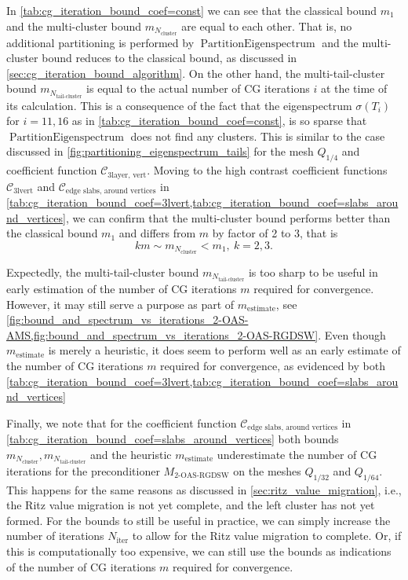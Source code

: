 In \cref{tab:cg_iteration_bound_coef=const} we can see that the classical bound $m_1$ and the multi-cluster bound $m_{N_{\text{cluster}}}$ are equal to each other. That is, no additional partitioning is performed by $\operatorname{PartitionEigenspectrum}$ and the multi-cluster bound reduces to the classical bound, as discussed in \cref{sec:cg_iteration_bound_algorithm}. 
On the other hand, the multi-tail-cluster bound $m_{N_{\text{tail-cluster}}}$ is equal to the actual number of CG iterations $i$ at the time of its calculation. This is a consequence of the fact that the eigenspectrum $\sigma(T_{i})$ for $i=11,16$ as in \cref{tab:cg_iteration_bound_coef=const}, is so sparse that $\operatorname{PartitionEigenspectrum}$ does not find any clusters. This is similar to the case discussed in \cref{fig:partitioning_eigenspectrum_tails} for the mesh $Q_{1/4}$ and coefficient function $\mathcal{C}_{\text{3layer, vert}}$.
Moving to the high contrast coefficient functions $\mathcal{C}_{\text{3lvert}}$ and $\mathcal{C}_{\text{edge slabs, around vertices}}$ in \cref{tab:cg_iteration_bound_coef=3lvert,tab:cg_iteration_bound_coef=slabs_around_vertices}, we can confirm that the multi-cluster bound performs better than the classical bound $m_1$ and differs from $m$ by factor of 2 to 3, that is  
\begin{equation}
    km \sim m_{N_{\text{cluster}}} < m_1, \ k = 2,3.
    \label{eq:multi_cluster_bound_factor}
\end{equation}

Expectedly, the multi-tail-cluster bound $m_{N_{\text{tail-cluster}}}$ is too sharp to be useful in early estimation of the number of CG iterations $m$ required for convergence. However, it may still serve a purpose as part of $m_{\text{estimate}}$, see \cref{fig:bound_and_spectrum_vs_iterations_2-OAS-AMS,fig:bound_and_spectrum_vs_iterations_2-OAS-RGDSW}. Even though $m_{\text{estimate}}$ is merely a heuristic, it does seem to perform well as an early estimate of the number of CG iterations $m$ required for convergence, as evidenced by both \cref{tab:cg_iteration_bound_coef=3lvert,tab:cg_iteration_bound_coef=slabs_around_vertices}

Finally, we note that for the coefficient function $\mathcal{C}_{\text{edge slabs, around vertices}}$ in \cref{tab:cg_iteration_bound_coef=slabs_around_vertices} both bounds $m_{N_{\text{cluster}}}, m_{N_{\text{tail-cluster}}}$ and the heuristic $m_{\text{estimate}}$ underestimate the number of CG iterations for the preconditioner $M_{\text{2-OAS-RGDSW}}$ on the meshes $Q_{1/32}$ and $Q_{1/64}$. This happens for the same reasons as discussed in \cref{sec:ritz_value_migration}, i.e., the Ritz value migration is not yet complete, and the left cluster has not yet formed. For the bounds to still be useful in practice, we can simply increase the number of iterations $N_{\text{iter}}$ to allow for the Ritz value migration to complete. Or, if this is computationally too expensive, we can still use the bounds as indications of the number of CG iterations $m$ required for convergence. 